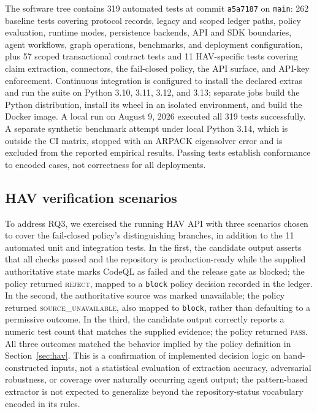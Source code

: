 \documentclass[11pt]{article}
\begin{document}
The software tree contains 319 automated tests at commit \texttt{a5a7187} on
\texttt{main}: 262 baseline tests covering protocol records, legacy and scoped
ledger paths, policy evaluation, runtime modes, persistence backends, API and
SDK boundaries, agent workflows, graph operations, benchmarks, and deployment
configuration, plus 57 scoped transactional contract tests and 11 HAV-specific
tests covering claim extraction, connectors, the fail-closed policy, the API
surface, and API-key enforcement. Continuous integration is configured to
install the declared extras and run the suite on Python 3.10, 3.11, 3.12, and
3.13; separate jobs build the Python distribution, install its wheel in an
isolated environment, and build the Docker image. A local run on August 9, 2026
executed all 319 tests successfully. A separate synthetic benchmark attempt
under local Python 3.14, which is outside the CI matrix, stopped with an
ARPACK eigensolver error and is excluded from the reported empirical results.
Passing tests establish conformance to encoded cases, not correctness for all
deployments.

\subsection{HAV verification scenarios}
\label{sec:hav-scenarios}

To address RQ3, we exercised the running HAV API with three scenarios chosen
to cover the fail-closed policy's distinguishing branches, in addition to the
11 automated unit and integration tests. In the first, the candidate output
asserts that all checks passed and the repository is production-ready while
the supplied authoritative state marks CodeQL as failed and the release gate
as blocked; the policy returned \textsc{reject}, mapped to a \texttt{block}
policy decision recorded in the ledger. In the second, the authoritative
source was marked unavailable; the policy returned
\textsc{source\_unavailable}, also mapped to \texttt{block}, rather than
defaulting to a permissive outcome. In the third, the candidate output
correctly reports a numeric test count that matches the supplied evidence; the
policy returned \textsc{pass}. All three outcomes matched the behavior implied
by the policy definition in Section~\ref{sec:hav}. This is a confirmation of
implemented decision logic on hand-constructed inputs, not a statistical
evaluation of extraction accuracy, adversarial robustness, or coverage over
naturally occurring agent output; the pattern-based extractor is not expected
to generalize beyond the repository-status vocabulary encoded in its rules.
\end{document}

